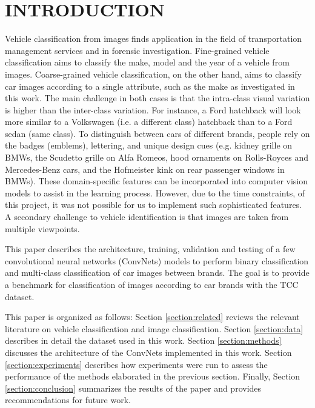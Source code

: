 \documentclass[conference]{IEEEtran}
\begin{document}
\section{INTRODUCTION} \label{intro}
Vehicle classification from images finds application in the field of transportation management services and in forensic investigation. Fine-grained vehicle classification aims to classify the make, model and the year of a vehicle from images. Coarse-grained vehicle classification, on the other hand, aims to classify car images according to a single attribute, such as the make as investigated in this work. The main challenge in both cases is that the intra-class visual variation is higher than the inter-class variation. For instance, a Ford hatchback will look more similar to a Volkswagen (i.e. a different class) hatchback than to a Ford sedan (same class). To distinguish between cars of different brands, people rely on the badges (emblems), lettering, and unique design cues (e.g. kidney grille on BMWs, the Scudetto grille on Alfa Romeos, hood ornaments on Rolls-Royces and Mercedes-Benz cars, and the Hofmeister kink on rear passenger windows in BMWs). These domain-specific features can be incorporated into computer vision models to assist in the learning process. However, due to the time constraints, of this project, it was not possible for us to implement such sophisticated features.
A secondary challenge to vehicle identification is that images are taken from multiple viewpoints. 

This paper describes the architecture, training, validation and testing of a few convolutional neural networks (ConvNets) models to perform binary classification and multi-class classification of car images between brands. The goal is to provide a benchmark for classification of images according to car brands with the TCC dataset. 

This paper is organized as follows: Section \ref{section:related} reviews the relevant literature on vehicle classification and image classification. Section \ref{section:data} describes in detail the dataset used in this work. Section \ref{section:methods} discusses the architecture of the ConvNets implemented in this work. Section \ref{section:experiments} describes how experiments were run to assess the performance of the methods elaborated in the previous section. Finally, Section \ref{section:conclusion} summarizes the results of the paper and provides recommendations for future work.
\end{document}
